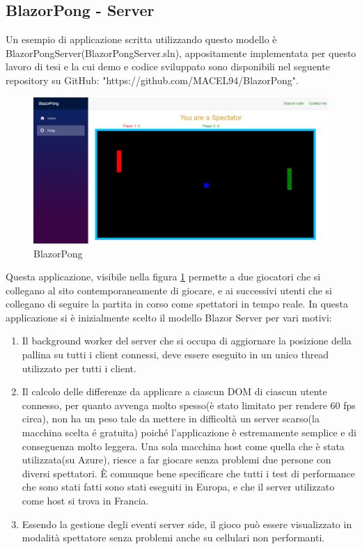 \subsection{BlazorPong - Server}\label{sez:bpongserv}
Un esempio di applicazione scritta utilizzando questo modello \`e BlazorPongServer(BlazorPongServer.sln), appositamente implementata per questo lavoro di tesi e la cui demo e codice sviluppato sono disponibili nel seguente repository su GitHub: "https://github.com/MACEL94/BlazorPong".

\begin{figure}[H]
	\centerline{\includegraphics[scale=0.3]{figure/BlazorPong.PNG}}
	\caption{BlazorPong}
	\label{fig:BlazorPong}
\end{figure}

Questa applicazione, visibile nella figura \ref{fig:BlazorPong} permette a due giocatori che si collegano al sito contemporaneamente di giocare, e ai successivi utenti che si collegano di seguire la partita in corso come spettatori in tempo reale.
In questa applicazione si \`e inizialmente scelto il modello Blazor Server per vari motivi:
\begin{enumerate}
	\item Il background worker del server che si occupa di aggiornare la posizione della pallina su tutti i client connessi, deve essere eseguito in un unico thread utilizzato per tutti i client.
	\item Il calcolo delle differenze da applicare a ciascun DOM di ciascun utente connesso, per quanto avvenga molto spesso(\`e stato limitato per rendere 60 fps circa), non ha un peso tale da mettere in difficolt\`a un server scarso(la macchina scelta \'e gratuita) poich\'e l'applicazione \`e estremamente semplice e di conseguenza molto leggera.
	Una sola macchina host come quella che \`e stata utilizzata(su Azure), riesce a far giocare senza problemi due persone con diversi spettatori.
	\`E comunque bene specificare che tutti i test di performance che sono stati fatti sono stati eseguiti in Europa, e che il server utilizzato come host si trova in Francia.
	\item Essendo la gestione degli eventi server side, il gioco pu\`o essere visualizzato in modalit\`a spettatore senza problemi anche su cellulari non performanti.
\end{enumerate}

